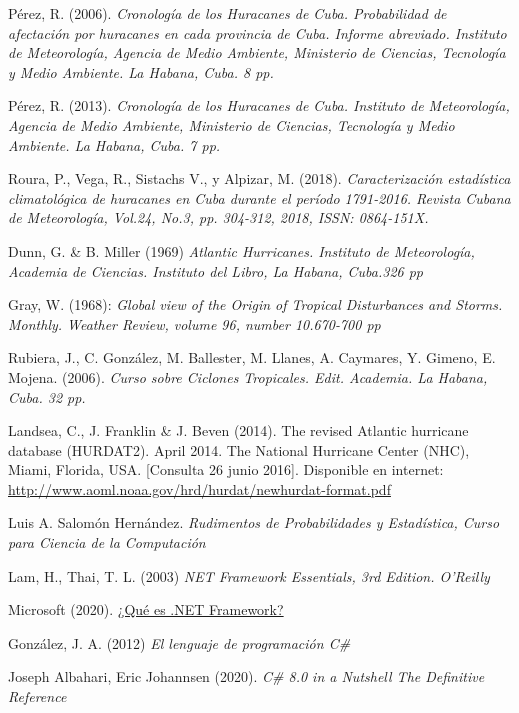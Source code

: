 %
%

\begin{thebibliography}{8}

 Pérez, R. (2006). \emph{Cronología de los Huracanes de Cuba. Probabilidad de afectación por huracanes en cada provincia de Cuba. Informe abreviado. Instituto de Meteorología, Agencia de Medio Ambiente, Ministerio de Ciencias, Tecnología y Medio Ambiente. La Habana, Cuba. 8 pp.}

 Pérez, R. (2013).\emph{ Cronología de los Huracanes de Cuba. Instituto de Meteorología, Agencia de Medio Ambiente, Ministerio de Ciencias, Tecnología y Medio Ambiente. La Habana, Cuba. 7 pp.}

Roura, P., Vega, R., Sistachs V., y Alpizar, M. (2018). \emph{Caracterización estadística climatológica de huracanes en Cuba durante el período 1791-2016. Revista Cubana de Meteorología, Vol.24, No.3, pp. 304-312, 2018, ISSN: 0864-151X.}

Dunn, G. \& B. Miller (1969)  \emph{Atlantic Hurricanes. Instituto de Meteorología, Academia de Ciencias. Instituto del Libro, La Habana, Cuba.326 pp} 

 Gray, W. (1968):  \emph{Global view of the Origin of Tropical Disturbances and Storms. Monthly. Weather Review, volume 96, number 10.670-700 pp}

Rubiera, J., C. González, M. Ballester, M. Llanes, A. Caymares, Y. Gimeno, E. Mojena. (2006). \emph{Curso sobre Ciclones Tropicales. Edit. Academia. La Habana, Cuba. 32 pp.}

Landsea, C., J. Franklin \& J. Beven (2014). The revised Atlantic hurricane database (HURDAT2). April 2014. The National Hurricane Center (NHC), Miami, Florida, USA. [Consulta 26 junio 2016]. Disponible en internet: \href{http://www.aoml.noaa.gov/hrd/hurdat/newhurdat-format.pdf}{http://www.aoml.noaa.gov/hrd/hurdat/newhurdat-format.pdf}

Luis A. Salomón Hernández. \emph{Rudimentos de Probabilidades y Estadística, Curso para Ciencia de la Computación}

  Lam, H., Thai, T. L. (2003)  \emph{NET Framework Essentials, 3rd Edition. O'Reilly}

Microsoft (2020). \href{https://dotnet.microsoft.com/learn/dotnet/what-is-dotnet-framework}{¿Qué es .NET Framework?}

 González, J. A. (2012)  \emph{El lenguaje de programación C\#} 









Joseph Albahari, Eric Johannsen (2020). \emph{C\# 8.0 in a Nutshell The Definitive Reference}



\end{thebibliography}
